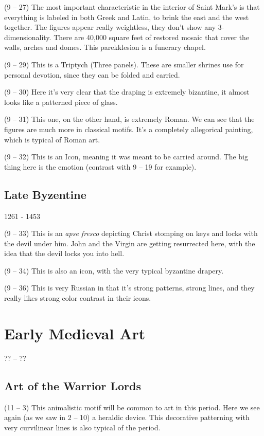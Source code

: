 \documentclass{article}
\begin{document}
    \begin{spacing}{1.2}
    \newpage
        (9 -- 27) The most important characteristic in the interior of Saint Mark's is that everything is labeled in both Greek and Latin, to brink the east and the west together. The figures appear really weightless,  they don't show any 3-dimensionality. There are 40,000 square feet of restored mosaic that cover the walls, arches and domes. This parekklesion is a funerary chapel.

        (9 -- 29) This is a Triptych (Three panels). These are smaller shrines use for personal devotion, since they can be folded and carried.

        (9 -- 30) Here it's very clear that the draping is extremely bizantine, it almost looks like a patterned piece of glass.

        (9 -- 31) This one, on the other hand, is extremely Roman. We can see that the figures are much more in classical motifs. It's a completely allegorical painting, which is typical of Roman art.

        (9 -- 32) This is an Icon, meaning it was meant to be carried around. The big thing here is the emotion (contrast with 9 -- 19 for example).

        \subsection{Late Byzentine}
        \begin{flushright}
            1261 - 1453
        \end{flushright}
        (9 -- 33) This is an \emph{apse fresco} depicting Christ stomping on keys and locks with the devil under him. John and the Virgin are getting resurrected here, with the idea that the devil locks you into hell.

        (9 -- 34) This is also an icon, with the very typical byzantine drapery.

        (9 -- 36) This is very Russian in that it's strong patterns, strong lines, and they really likes strong color contrast in their icons.

        \section{Early Medieval Art}
        \begin{flushright}
            ?? -- ??
        \end{flushright}
        \subsection{Art of the Warrior Lords}
        (11 -- 3) This animalistic motif will be common to art in this period. Here we see again (as we saw in 2 -- 10) a heraldic device. This decorative patterning with very curvilinear lines is also typical of the period.


\end{spacing}
\end{document}
